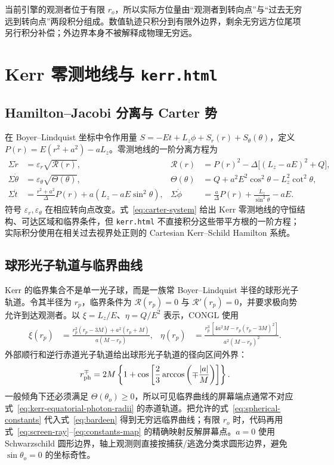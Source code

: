 \documentclass[UTF8,11pt,a4paper,fontset=fandol]{ctexart}
\newcommand{\Rpot}{\mathcal R}
\newcommand{\Tpot}{\Theta}
\begin{document}
当前引擎的观测者位于有限 \(r_o\)，所以实际方位量由“观测者到转向点”与“过去无穷远到转向点”两段积分组成。数值轨迹只积分到有限外边界，剩余无穷远方位尾项另行积分补偿；外边界本身不被解释成物理无穷远。

\section{Kerr 零测地线与 \texttt{kerr.html}}

\subsection{Hamilton--Jacobi 分离与 Carter 势}

在 Boyer--Lindquist 坐标中令作用量 \(S=-Et+L_z\phi+S_r(r)+S_\theta(\theta)\)，定义 \(P(r)=E(r^2+a^2)-aL_z\)。零测地线的一阶分离方程为\cite{Carter1968a,Chandrasekhar1983,GrallaLupsasca2020}
\begin{align}
 \Sigma\dot r&=\varepsilon_r\sqrt{\Rpot(r)},
 &\Rpot(r)&=P(r)^2-\Delta\bigl[(L_z-aE)^2+Q\bigr],\nonumber\\
 \Sigma\dot\theta&=\varepsilon_\theta\sqrt{\Tpot(\theta)},
 &\Tpot(\theta)&=Q+a^2E^2\cos^2\theta-L_z^2\cot^2\theta,\nonumber\\
 \Sigma\dot t&=\frac{r^2+a^2}{\Delta}P(r)+a(L_z-aE\sin^2\theta),
 &\Sigma\dot\phi&=\frac{a}{\Delta}P(r)+\frac{L_z}{\sin^2\theta}-aE. \label{eq:carter-system}
\end{align}
符号 \(\varepsilon_r,\varepsilon_\theta\) 在相应转向点改变。式~\eqref{eq:carter-system} 给出 Kerr 零测地线的守恒结构、可达区域和临界条件，但 \texttt{kerr.html} 不直接积分这些带平方根的一阶方程；实际积分使用在相关过去视界处正则的 Cartesian Kerr--Schild Hamilton 系统。

\subsection{球形光子轨道与临界曲线}

Kerr 的临界集合不是单一光子球，而是一族常 Boyer--Lindquist 半径的球形光子轨道。令其半径为 \(r_p\)，临界条件为 \(\Rpot(r_p)=0\) 与 \(\Rpot'(r_p)=0\)，并要求极向势允许到达观测者。以 \(\xi=L_z/E\)、\(\eta=Q/E^2\) 表示，CONGL 使用\cite{Teo2003}
\begin{align}
 \xi(r_p)&=\frac{r_p^2(r_p-3M)+a^2(r_p+M)}{a(M-r_p)},
 &\eta(r_p)&=\frac{r_p^3\,[4a^2M-r_p(r_p-3M)^2]}
 {a^2(M-r_p)^2}. \label{eq:spherical-constants}
\end{align}
外部顺行和逆行赤道光子轨道给出球形光子轨道的径向区间外界：
\begin{align}
 r_{\rm ph}^{\mp}=2M\left\{1+\cos\left[\frac{2}{3}
 \arccos\left(\mp\frac{|a|}{M}\right)\right]\right\}. \label{eq:kerr-equatorial-photon-radii}
\end{align}
一般倾角下还必须满足 \(\Tpot(\theta_o)\geq0\)，所以可见临界曲线的屏幕端点通常不对应式~\eqref{eq:kerr-equatorial-photon-radii} 的赤道轨道。把允许的式~\eqref{eq:spherical-constants} 代入式~\eqref{eq:bardeen} 得到无穷远临界曲线；有限 \(r_o\) 时，代码再用式~\eqref{eq:screen-ray}--\eqref{eq:constants-map} 的精确映射反解屏幕点。\(a=0\) 使用 Schwarzschild 圆形边界，轴上观测则直接按捕获/逃逸分类求圆形边界，避免 \(\sin\theta_o=0\) 的坐标奇性。
\end{document}
